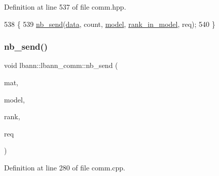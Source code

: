 Definition at line 537 of file comm.\+hpp.


\begin{DoxyCode}
538                                                            \{
539     \hyperlink{classlbann_1_1lbann__comm_a70679ca6477c56972f9bc53d52e5ce21}{nb\_send}(\hyperlink{namespacelbann_1_1cnpy__utils_a9ac86d96ccb1f8b4b2ea16441738781f}{data}, count, \hyperlink{namespacelbann_adee41f31f15f3906cbdcce4a1417eb56a20f35e630daf44dbfa4c3f68f5399d8c}{model}, \hyperlink{classlbann_1_1lbann__comm_a0dcccd57c2b591eb7682e192e0a09033}{rank\_in\_model}, req);
540   \}
\end{DoxyCode}
\mbox{\label{classlbann_1_1lbann__comm_ae86cb0f65c8e11dec7a1cf0d3ce17cd2}} 
\subsubsection{\texorpdfstring{nb\+\_\+send()}{nb\_send()}\hspace{0.1cm}{\footnotesize\ttfamily [3/6]}}
{\footnotesize\ttfamily void lbann\+::lbann\+\_\+comm\+::nb\+\_\+send (\begin{DoxyParamCaption}\item[{const \hyperlink{base_8hpp_a68f11fdc31b62516cb310831bbe54d73}{Mat} \&}]{mat,  }\item[{int}]{model,  }\item[{int}]{rank,  }\item[{El\+::mpi\+::\+Request$<$ Data\+Type $>$ \&}]{req }\end{DoxyParamCaption})}



Definition at line 280 of file comm.\+cpp.


